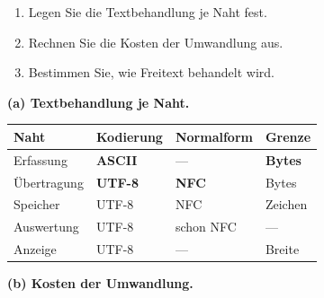 \begin{aufgabe}
\begin{enumerate}[label=(\alph*)]
\item Legen Sie die Textbehandlung je Naht fest.
\item Rechnen Sie die Kosten der Umwandlung aus.
\item Bestimmen Sie, wie Freitext behandelt wird.
\end{enumerate}

\loesung
\textbf{(a) Textbehandlung je Naht.}

\begin{center}
{\small
\renewcommand{\arraystretch}{1.45}
\begin{tabular}{@{}P{2.6cm}P{2.4cm}P{2.4cm}P{1.6cm}@{}}
\toprule
\textbf{Naht} & \textbf{Kodierung} & \textbf{Normalform} & \textbf{Grenze}\\
\midrule
Erfassung & \textbf{ASCII} & --- & \textbf{Bytes}\\
Übertragung & \textbf{UTF-8} & \textbf{NFC} & Bytes\\
Speicher & UTF-8 & NFC & Zeichen\\
Auswertung & UTF-8 & \textcolor{gruen}{schon NFC} & --- \\
Anzeige & UTF-8 & --- & \textcolor{gruen}{Breite}\\
\bottomrule
\end{tabular}}
\end{center}

\begin{center}
\begin{minipage}{0.88\textwidth}
\end{minipage}
\end{center}

\begin{center}
\end{center}

\medskip
\textbf{(b) Kosten der Umwandlung.}


\end{aufgabe}
